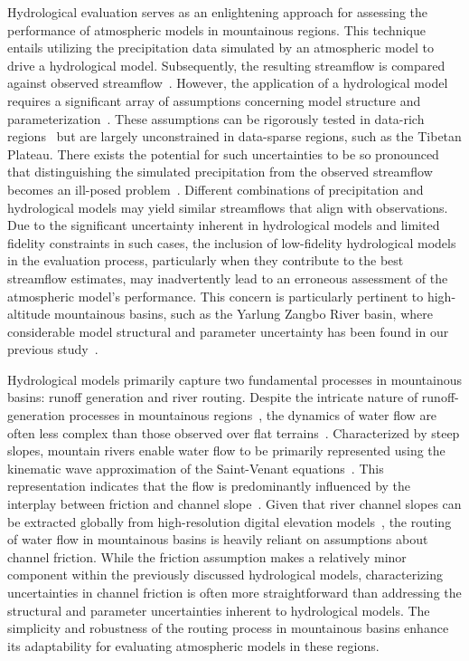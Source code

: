 \documentclass[draft]{agujournal2019}
\begin{document}
Hydrological evaluation serves as an enlightening approach for assessing the performance of atmospheric models in mountainous regions. This technique entails utilizing the precipitation data simulated by an atmospheric model to drive a hydrological model. Subsequently, the resulting streamflow is compared against observed streamflow~\cite{krier2012WRR, henn2015WRR, henn2016WRR, pang2020HESS}. However, the application of a hydrological model requires a significant array of assumptions concerning model structure and parameterization~\cite{kirchner2009WRR, henn2016WRR}. These assumptions can be rigorously tested in data-rich regions~\cite{clark2011WRR, zheng2020JAMES} but are largely unconstrained in data-sparse regions, such as the Tibetan Plateau. There exists the potential for such uncertainties to be so pronounced that distinguishing the simulated precipitation from the observed streamflow becomes an ill-posed problem~\cite{renard2010WRR}. Different combinations of precipitation and hydrological models may yield similar streamflows that align with observations. Due to the significant uncertainty inherent in hydrological models and limited fidelity constraints in such cases, the inclusion of low-fidelity hydrological models in the evaluation process, particularly when they contribute to the best streamflow estimates, may inadvertently lead to an erroneous assessment of the atmospheric model's performance. This concern is particularly pertinent to high-altitude mountainous basins, such as the Yarlung Zangbo River basin, where considerable model structural and parameter uncertainty has been found in our previous study~\cite{lei2024JH}.

Hydrological models primarily capture two fundamental processes in mountainous basins: runoff generation and river routing. Despite the intricate nature of runoff-generation processes in mountainous regions~\cite{van_tiel2024NW}, the dynamics of water flow are often less complex than those observed over flat terrains~\cite{getirana2013WRR, moussa1996JH}. Characterized by steep slopes, mountain rivers enable water flow to be primarily represented using the kinematic wave approximation of the Saint-Venant equations~\cite{moussa1996JH}. This representation indicates that the flow is predominantly influenced by the interplay between friction and channel slope~\cite{getirana2013WRR, moussa1996JH}. Given that river channel slopes can be extracted globally from high-resolution digital elevation models~\cite{yamazaki2017GRL, yamazaki2019WRR}, the routing of water flow in mountainous basins is heavily reliant on assumptions about channel friction. While the friction assumption makes a relatively minor component within the previously discussed hydrological models, characterizing uncertainties in channel friction is often more straightforward than addressing the structural and parameter uncertainties inherent to hydrological models. The simplicity and robustness of the routing process in mountainous basins enhance its adaptability for evaluating atmospheric models in these regions.
\end{document}
